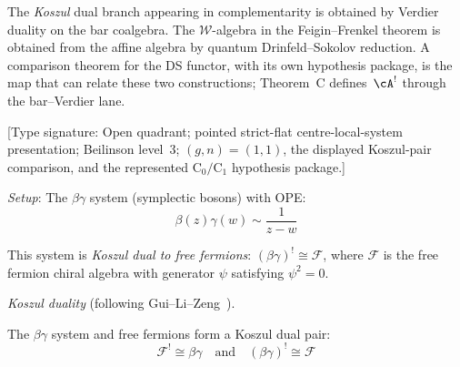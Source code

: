 \begin{example}
\begin{remark}
\label{rem:km-complementarity-vs-feigin-frenkel}
The \emph{Koszul} dual branch appearing in complementarity is
obtained by Verdier duality on the bar coalgebra. The
$\mathcal{W}$-algebra in the Feigin--Frenkel theorem is obtained
from the affine algebra by quantum Drinfeld--Sokolov reduction.  A
comparison theorem for the DS functor, with its own hypothesis
package, is the map that can relate these two constructions; Theorem~C
defines~$\cA^!$ through the bar--Verdier lane.
\end{remark}
\end{example}

\begin{example}
\label{ex:betagamma-fermion-koszul-duality}
\textup{[Type signature: Open quadrant; pointed strict-flat
centre-local-system presentation; Beilinson level~3;
\((g,n)=(1,1)\), the displayed Koszul-pair comparison, and the
represented \(\mathrm C_0/\mathrm C_1\) hypothesis package.]}

\emph{Setup}: The $\beta\gamma$ system (symplectic bosons) with OPE:
\begin{equation}
\beta(z)\gamma(w) \sim \frac{1}{z-w}
\end{equation}

This system is \emph{Koszul dual to free fermions}: $(\beta\gamma)^! \cong \mathcal{F}$,
where $\mathcal{F}$ is the free fermion chiral algebra with generator $\psi$ satisfying $\psi^2=0$.

\emph{Koszul duality} (following Gui--Li--Zeng~\cite{GLZ22}).

\begin{theorem}
\label{thm:fermion-boson-koszul-hg}
The $\beta\gamma$ system and free fermions form a Koszul dual pair:
\begin{equation}
\mathcal{F}^! \cong \beta\gamma \quad \text{and} \quad (\beta\gamma)^! \cong \mathcal{F}
\end{equation}
\end{theorem}


\end{example}
